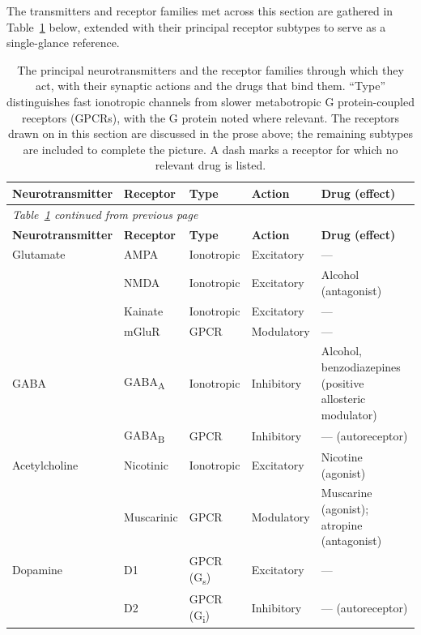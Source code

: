 \documentclass[11pt]{article}
\begin{document}
The transmitters and receptor families met across this section are gathered in Table~\ref{tab:transmitters} below, extended with their principal receptor subtypes to serve as a single-glance reference.

{\footnotesize
\renewcommand{\arraystretch}{1.3}
\begin{longtable}{p{2.9cm} p{2.4cm} p{1.8cm} p{1.9cm} p{4.0cm}}
\caption{The principal neurotransmitters and the receptor families through which they act, with their synaptic actions and the drugs that bind them. ``Type'' distinguishes fast ionotropic channels from slower metabotropic G protein-coupled receptors (GPCRs), with the G protein noted where relevant. The receptors drawn on in this section are discussed in the prose above; the remaining subtypes are included to complete the picture. A dash marks a receptor for which no relevant drug is listed.}
\label{tab:transmitters} \\
\toprule
\textbf{Neurotransmitter} & \textbf{Receptor} & \textbf{Type} & \textbf{Action} & \textbf{Drug (effect)} \\
\midrule
\endfirsthead
\multicolumn{5}{l}{\emph{\small Table~\ref{tab:transmitters} continued from previous page}} \\
\toprule
\textbf{Neurotransmitter} & \textbf{Receptor} & \textbf{Type} & \textbf{Action} & \textbf{Drug (effect)} \\
\midrule
\endhead
\bottomrule
\endfoot
\bottomrule
\endlastfoot
Glutamate & AMPA & Ionotropic & Excitatory & --- \\
 & NMDA & Ionotropic & Excitatory & Alcohol (antagonist) \\
 & Kainate & Ionotropic & Excitatory & --- \\
 & mGluR & GPCR & Modulatory & --- \\
\midrule
GABA & GABA\textsubscript{A} & Ionotropic & Inhibitory & Alcohol, benzodiazepines (positive allosteric modulator) \\
 & GABA\textsubscript{B} & GPCR & Inhibitory & --- (autoreceptor) \\
\midrule
Acetylcholine & Nicotinic & Ionotropic & Excitatory & Nicotine (agonist) \\
 & Muscarinic & GPCR & Modulatory & Muscarine (agonist); atropine (antagonist) \\
\midrule
Dopamine & D1 & GPCR (G\textsubscript{s}) & Excitatory & --- \\
 & D2 & GPCR (G\textsubscript{i}) & Inhibitory & --- (autoreceptor) \\
\midrule

\end{longtable}}
\end{document}

